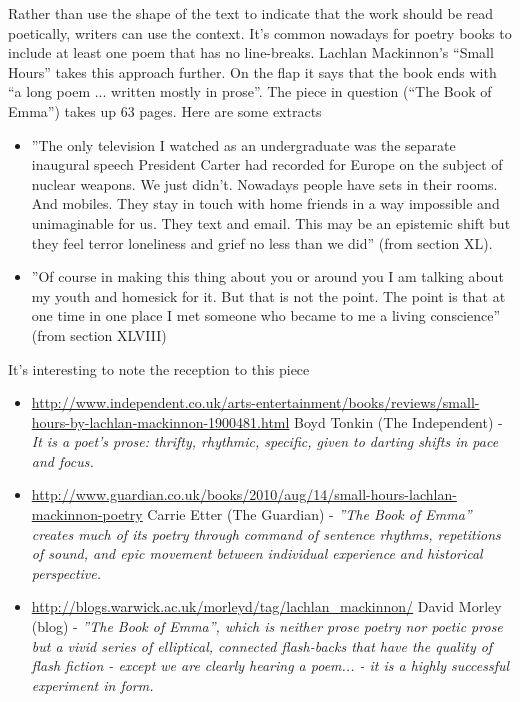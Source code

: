\documentclass[11pt]{article}
\begin{document}
Rather than use the shape of the text to indicate that the work should be read poetically, writers can use the context. It's common nowadays for poetry books to include at least one poem that has no line-breaks.  Lachlan Mackinnon's ``Small Hours'' takes this approach further. On the flap it says  that the book ends with ``a long poem ...  written mostly in prose''. The piece in question (``The Book of Emma'') takes up 63 pages. Here are some extracts
\begin{itemize}
\item ''The only television I watched as an undergraduate was the separate inaugural speech President Carter had recorded for Europe on the subject of nuclear weapons. We just didn't. Nowadays people have sets in their rooms. And mobiles. They stay in touch with home friends in a way impossible and unimaginable for us. They text and email. This may be an epistemic shift but they feel terror loneliness and grief no less than we did'' (from section XL).
\item ''Of course in making this thing about you or around you I am talking about my youth and homesick for it. But that is not the point. The point is that at one time in one place I met someone who became to me a living conscience'' (from section XLVIII) 

\end{itemize}

It's interesting to note the reception to this piece
\begin{itemize}
\item \url{http://www.independent.co.uk/arts-entertainment/books/reviews/small-hours-by-lachlan-mackinnon-1900481.html} Boyd Tonkin (The Independent) - \textit{It is a poet's prose: thrifty, rhythmic, specific, given to darting shifts in pace and focus.}
\item  \url{http://www.guardian.co.uk/books/2010/aug/14/small-hours-lachlan-mackinnon-poetry} Carrie Etter (The Guardian) - \textit{''The Book of Emma'' creates much of its poetry through command of sentence rhythms, repetitions of sound, and epic movement between individual experience and historical perspective.}
\item  \url{http://blogs.warwick.ac.uk/morleyd/tag/lachlan_mackinnon/}
David Morley (blog) - \textit{''The Book of Emma'', which is neither prose poetry nor poetic prose but a vivid series of elliptical, connected flash-backs that have the quality of flash fiction - except we are clearly hearing a poem... - it is a highly successful experiment in form.}
\end{itemize}
\end{document}
